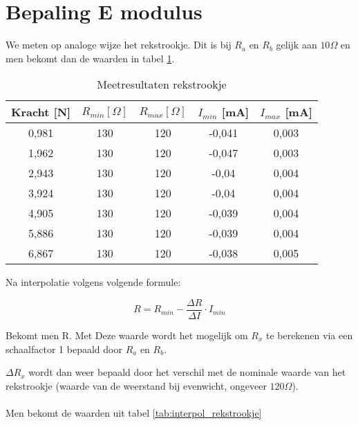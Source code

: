 \section{Bepaling E modulus}

We meten op analoge wijze het rekstrookje.
Dit is bij $R_a$ en $R_b$ gelijk aan $10\Omega$ en 
men bekomt dan de waarden in tabel \ref{tab:rekstrookje}.

\begin{table}[h]
    \centering
    \caption{Meetresultaten rekstrookje}
    \label{tab:rekstrookje}

    \begin{tabular}{| c | c | c | c | c |}
        \hline
        Kracht [N] & $R_{min} [\Omega]$& $R_{max} [\Omega]$& $I_{min}$ [mA] & $I_{max}$ [mA] \\ \hline
        0,981      & 130               & 120               & -0,041    & 0,003 \\ \hline
        1,962      & 130               & 120               &-0,047     & 0,003 \\ \hline
        2,943      & 130               & 120               &-0,04      & 0,004 \\ \hline
        3,924      & 130               & 120               &-0,04      & 0,004 \\ \hline
        4,905      & 130               & 120               &-0,039     & 0,004 \\ \hline
        5,886      & 130               & 120               &-0,039     & 0,004 \\ \hline
        6,867      & 130               & 120               &-0,038     & 0,005 \\ \hline
    \end{tabular}
\end{table}

Na interpolatie volgens volgende formule:

\begin{equation}
    R = R_{min} - \frac{\Delta R}{\Delta I} \cdot I_{min}
\end{equation}


Bekomt men R. Met Deze waarde wordt het mogelijk om $R_{x}$ te
berekenen via een schaalfactor 1 bepaald door $R_{a}$ en $R_{b}$.

$\Delta R_{x}$ wordt dan weer bepaald door het verschil met de
nominale waarde van het rekstrookje (waarde van de weerstand
bij evenwicht, ongeveer $120\Omega$).
\\ \\
Men bekomt de waarden uit tabel \ref{tab:interpol_rekstrookje}

